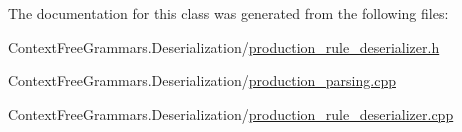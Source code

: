 The documentation for this class was generated from the following files\+:\begin{DoxyCompactItemize}
\item 
Context\+Free\+Grammars.\+Deserialization/\mbox{\hyperlink{production__rule__deserializer_8h}{production\+\_\+rule\+\_\+deserializer.\+h}}\item 
Context\+Free\+Grammars.\+Deserialization/\mbox{\hyperlink{production__parsing_8cpp}{production\+\_\+parsing.\+cpp}}\item 
Context\+Free\+Grammars.\+Deserialization/\mbox{\hyperlink{production__rule__deserializer_8cpp}{production\+\_\+rule\+\_\+deserializer.\+cpp}}\end{DoxyCompactItemize}
